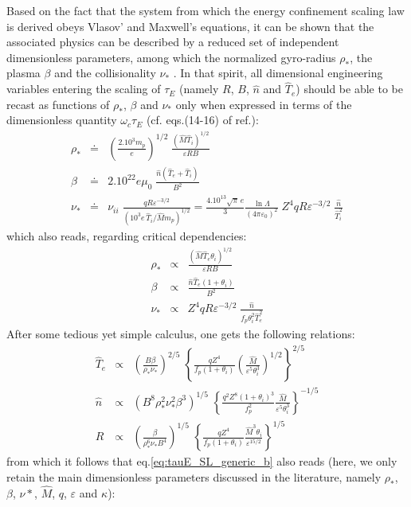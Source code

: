 Based on the fact that the system from which the energy confinement scaling law is derived obeys Vlasov' and Maxwell's equations, it can be shown that the associated physics can be described by a reduced set of independent dimensionless parameters, among which the normalized gyro-radius $\rho_*$, the plasma $\beta$ and the collisionality $\nu_*$ \cite{Kadomtsev1975, Connor1977}. In that spirit, all dimensional engineering variables entering the scaling of $\tau_E$ (namely $R$, $B$, $\hat n$ and $\hat T_e$) should be able to be recast as functions of $\rho_*$, $\beta$ and $\nu_*$ only when expressed in terms of the dimensionless quantity $\omega_c \tau_E$ (cf. eqs.(14-16) of ref.\cite{ITERphysics_chap2}):
\begin{eqnarray}
  \rho_*  &\doteq& \left( \frac{2.10^3 m_p}{e} \right)^{1/2}\; \frac{(\hat M \hat T_i)^{1/2}}{\varepsilon R B} \\
  \beta   &\doteq& 2.10^{22}e\mu_0\; \frac{\hat n(\hat T_e+\hat T_i)}{B^2} \\
  \nu_*   &\doteq& \nu_{ii}\; \frac{qR \varepsilon^{-3/2}}{(10^3e\, \hat T_i/\hat M m_p)^{1/2}}
   = \frac{4.10^{13}\sqrt{\pi}\,e}{3} \frac{\ln\Lambda}{(4\pi\varepsilon_0)^2}\; 
     Z^4 qR \varepsilon^{-3/2}\; \frac{\hat n}{\hat T_i^2}
\end{eqnarray}
which also reads, regarding critical dependencies:
\begin{eqnarray}
\rho_*  &\propto& \frac{(\hat M \hat T_e \theta_i)^{1/2}}{\varepsilon R B} \\
\beta   &\propto& \frac{\hat n\hat T_e(1+\theta_i)}{B^2} \\
\nu_*   &\propto& Z^4 qR \varepsilon^{-3/2}\; \frac{\hat n}{f_p \theta_i^2\hat T_e^2}
\end{eqnarray}
After some tedious yet simple calculus, one gets the following relations:
\begin{eqnarray}
\hat T_e &\propto& \left( \frac{B\beta}{\rho_*\nu_*} \right)^{2/5} \; 
 \left\{ \frac{qZ^4}{f_p(1+\theta_i)} \left(\frac{\hat M}{\varepsilon^5\theta_i^3}\right)^{1/2} \right\}^{2/5} \\
\hat n   &\propto& \left( B^8\rho_*^2\nu_*^2\beta^3 \right)^{1/5} \;
 \left\{ \frac{q^2Z^8(1+\theta_i)^3}{f_p^2} \frac{\hat M}{\varepsilon^5\theta_i^3} \right\}^{-1/5}\\
R        &\propto& \left( \frac{\beta}{\rho_*^6\nu_*B^4} \right)^{1/5}\;
\left\{ \frac{qZ^4}{f_p(1+\theta_i)} \frac{\hat M^3\theta_i}{\varepsilon^{15/2}} \right\}^{1/5}
\end{eqnarray}
from which it follows that eq.\ref{eq:tauE_SL_generic_b} also reads (here, we only retain the main dimensionless parameters discussed in the literature, namely $\rho_*$, $\beta$, $\nu*$, $\hat M$, $q$, $\varepsilon$ and $\kappa$): 
